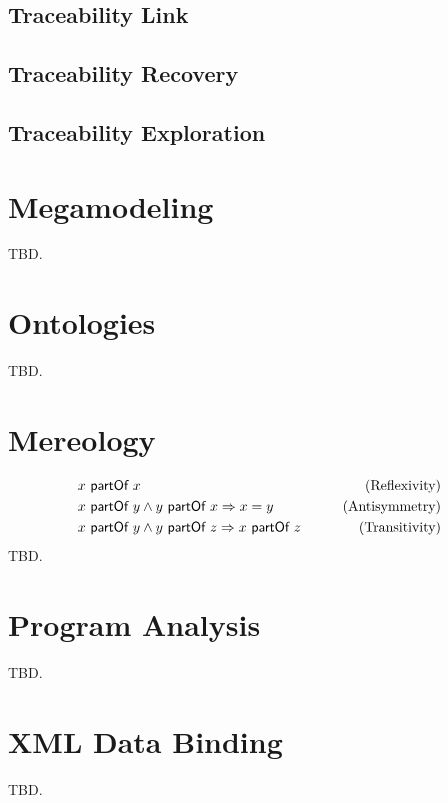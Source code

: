 \subsection{Traceability Link}
\subsection{Traceability Recovery}
\subsection{Traceability Exploration}

\section{Megamodeling}
TBD.

\subsection{\megal}
\subsubsection{\megalxtext}

\section{Ontologies}
TBD.

\section{Mereology}
\begin{align}
&x ~\textsf{partOf}~ x 
&\qquad \text{(Reflexivity)}
\\&x ~\textsf{partOf}~ y \wedge y ~\textsf{partOf}~ x \Rightarrow x = y
&\qquad \text{(Antisymmetry)}
\\&x ~\textsf{partOf}~ y \wedge y ~\textsf{partOf}~ z \Rightarrow x ~\textsf{partOf}~ z
&\qquad \text{(Transitivity)}
\end{align}
TBD.

\section{Program Analysis}
TBD.

\section{XML Data Binding}
TBD.


